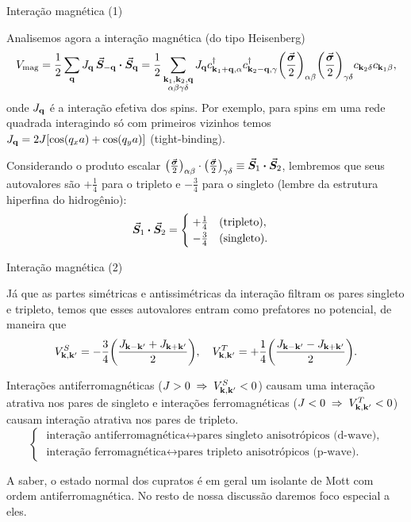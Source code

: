 \documentclass[8pt,aspectratio=169,xcolor={table,dvipsnames,usenames}]{beamer}
\begin{document}
\begin{frame}{Interação magnética (1)}

Analisemos agora a interação magnética (do tipo Heisenberg)
$$
V_{\text{mag}} = \frac{1}{2} \sum_{\q} J_{\q} \, \va*{S}_{-\q} \vdot \va*{S}_{\q} =
\frac{1}{2} \sum_{\substack{\k_1,\k_2,\q \\ \alpha\beta\gamma\delta}} J_{\q} c_{\k_1+\q,\alpha}^\d c_{\k_2-\q,\gamma}^\d
\qty(\frac{\va*{\s}}{2})_{\alpha\beta} \qty(\frac{\va*{\s}}{2})_{\gamma\delta} c_{\k_2\delta} c_{\k_1\beta},
$$
onde $J_{\vb{q}}$ é a interação efetiva dos spins. Por exemplo, para spins em uma rede quadrada interagindo só com primeiros vizinhos temos $J_{\vb{q}} = 2 J [\cos(q_x a) + \cos(q_y a)]$ (tight-binding).

Considerando o produto escalar $\qty(\frac{\va*{\s}}{2})_{\alpha\beta} \cdot \qty(\frac{\va*{\s}}{2})_{\gamma\delta} \equiv \va*{S}_1 \vdot \va*{S}_2$, lembremos que seus autovalores são $+\frac{1}{4}$ para o tripleto e $-\frac{3}{4}$ para o singleto (lembre da estrutura hiperfina do hidrogênio):
$$
\va*{S}_1 \vdot \va*{S}_2 =
\begin{cases}
\; +\frac{1}{4} \quad \text{(tripleto)}, \\
\; -\frac{3}{4} \quad \text{(singleto)}.
\end{cases}
$$

\end{frame}




\begin{frame}{Interação magnética (2)}

Já que as partes simétricas e antissimétricas da interação filtram os pares singleto e tripleto, temos que esses autovalores entram como prefatores no potencial, de maneira que
$$
V_{\vb{k},\vb{k}'}^S = -\frac{3}{4} \qty(\frac{J_{\vb{k}-\vb{k}'} + J_{\vb{k}+\vb{k}'}}{2}), \quad
V_{\vb{k},\vb{k}'}^T = +\frac{1}{4} \qty(\frac{J_{\vb{k}-\vb{k}'} - J_{\vb{k}+\vb{k}'}}{2}).
$$

Interações antiferromagnéticas ($J > 0 \; \Rightarrow \; V_{\vb{k},\vb{k}'}^S < 0$) causam uma interação atrativa nos pares de singleto e interações ferromagnéticas ($J < 0 \; \Rightarrow \; V_{\vb{k},\vb{k}'}^T < 0$) causam interação atrativa nos pares de tripleto.
$$
\begin{cases}
\; \text{interação antiferromagnética} \leftrightarrow \text{pares singleto anisotrópicos (d-wave),} \\
\; \text{interação ferromagnética} \leftrightarrow \text{pares tripleto anisotrópicos (p-wave).}
\end{cases}
$$

A saber, o estado normal dos cupratos é em geral um isolante de Mott com ordem antiferromagnética. No resto de nossa discussão daremos foco especial a eles.

\end{frame}
\end{document}

